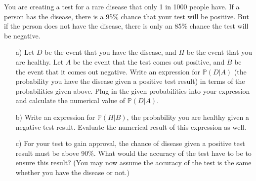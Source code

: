 \documentclass[]{article}
\newif\ifsolutions
\newif\ifmotivation
\renewcommand{\answer}[1]{{\color{mydarkblue}\textbf{Solution:}#1}}
\begin{document}
\begin{qunlist}
\ifmotivation
{\motivation {Motivation - Basic counting and probability.}}
\fi 


You are creating a test for a rare disease that only 1 in 1000 people have. If a person has the disease, there is a 95\% chance that your test will be positive.  But if the person does not have the disease, there is only an 85\% chance the test will be negative.

\begin{enumerate}
\qpart 
\item[a)] Let $D$ be the event that you have the disease, and $H$ be the event that you are healthy.  Let $A$ be the event that the test comes out positive, and $B$ be the event that it comes out negative.  Write an expression for $\mathbb{P}(D|A)$ (the probability you have the disease given a positive test result) in terms of the probabilities given above.  Plug in the given probabilities into your expression and calculate the numerical value of $\mathbb{P}(D|A)$.

\ifsolutions{ \answer {
\[ P(D|A) = \frac{P(A|D)P(D)}{P(A)} = \frac{P(A|D)P(D)}{P(A|D)P(D) + P(A|H)P(H)} = \frac{0.95 \cdot 0.001}{0.95 \cdot 0.001 + 0.15 \cdot 0.999} \]
}}\fi

\qpart
\item[b)] Write an expression for $\mathbb{P}(H|B)$, the probability you are healthy given a negative test result.  Evaluate the numerical result of this expression as well.

\ifsolutions{ \answer {
\[ P(H|B) = \frac{P(B|H)P(H)}{P(B)} = \frac{P(B|H)P(H)}{P(B|H)P(H) + P(B|D)P(D)} = \frac{0.85 \cdot 0.999}{0.85 \cdot 0.999 + 0.05 \cdot 0.001} \]
}}\fi

\qpart
\item[c)] For your test to gain approval, the chance of disease given a positive test result must be above 90\%. What would the accuracy of the test have to be to ensure this result?  (You may now assume the accuracy of the test is the same whether you have the disease or not.)

\ifsolutions{ \answer {
Solve for $x$:
\[ P(D|A) = \frac{x \cdot 0.001}{x \cdot 0.001 + (1-x) \cdot 0.999} = 0.9 \] %
}}\fi

\end{enumerate}


\end{qunlist}
\end{document}
